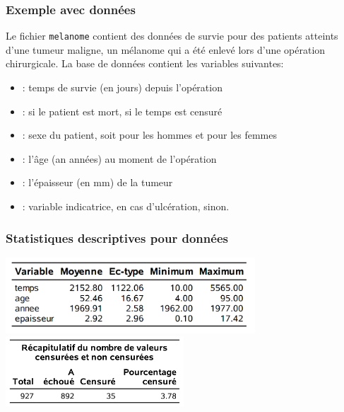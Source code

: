 \documentclass{beamer}
\begin{document}
\begin{frame}
\frametitle{Exemple avec données }
Le fichier \texttt{melanome} contient des données de survie pour des patients atteints d'une tumeur maligne, un mélanome qui a été enlevé lors d'une opération chirurgicale. La base de données contient les variables suivantes:


{ \footnotesize
\begin{itemize}
\itemsep0em 
\item {}: temps de survie (en jours) depuis l'opération 
\item {}:  si le patient est mort,  si le temps est censuré
\item {}: sexe du patient, soit  pour les hommes et  pour les femmes
\item {}: l'âge (an années) au moment de l'opération
\item {}: l'épaisseur (en mm) de la tumeur
\item {}: variable indicatrice,  en cas d'ulcération,  sinon.
\end{itemize}
}

\end{frame}

\begin{frame}
\frametitle{Statistiques descriptives pour données }
\begin{center}
\includegraphics[width = 0.7\textwidth]{img/c7/diapos7e10}
\includegraphics[width = 0.5\textwidth]{img/c7/diapos7e09}
\end{center}
\end{frame}
\end{document}
